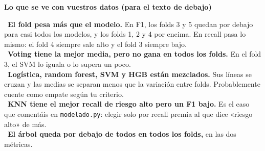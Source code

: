 \documentclass[11pt,a4paper]{article}
\begin{document}
{\smallskip\noindent\textbf{Lo que se ve con vuestros datos (para el texto de debajo)}\par
\hspace*{1.0em}\textbullet~\textbf{El fold pesa más que el modelo.} En F1, los folds 3 y 5 quedan por debajo para casi todos los modelos, y los folds 1, 2 y 4 por encima. En recall pasa lo mismo: el fold 4 siempre sale alto y el fold 3 siempre bajo. \\{}
\hspace*{1.0em}\textbullet~\textbf{Voting tiene la mejor media, pero no gana en todos los folds.} En el fold 3, el SVM lo iguala o lo supera un poco. \\{}
\hspace*{1.0em}\textbullet~\textbf{Logística, random forest, SVM y HGB están mezclados.} Sus líneas se cruzan y las medias se separan menos que la variación entre folds. Probablemente cuente como empate según tu criterio. \\{}
\hspace*{1.0em}\textbullet~\textbf{KNN tiene el mejor recall de riesgo alto pero un F1 bajo.} Es el caso que comentáis en \texttt{modelado.py}: elegir solo por recall premia al que dice «riesgo alto» de más. \\{}
\hspace*{1.0em}\textbullet~\textbf{El árbol queda por debajo de todos en todos los folds,} en las dos métricas.

}
\end{document}
